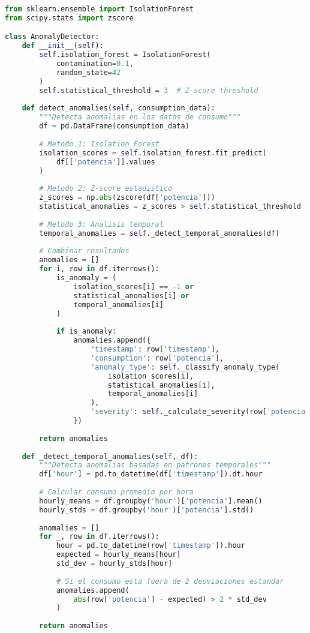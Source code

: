 \begin{lstlisting}[language=Python, caption=Sistema de detección de anomalías]
from sklearn.ensemble import IsolationForest
from scipy.stats import zscore

class AnomalyDetector:
    def __init__(self):
        self.isolation_forest = IsolationForest(
            contamination=0.1,
            random_state=42
        )
        self.statistical_threshold = 3  # Z-score threshold
        
    def detect_anomalies(self, consumption_data):
        """Detecta anomalias en los datos de consumo"""
        df = pd.DataFrame(consumption_data)
        
        # Metodo 1: Isolation Forest
        isolation_scores = self.isolation_forest.fit_predict(
            df[['potencia']].values
        )
        
        # Metodo 2: Z-score estadistico
        z_scores = np.abs(zscore(df['potencia']))
        statistical_anomalies = z_scores > self.statistical_threshold
        
        # Metodo 3: Analisis temporal
        temporal_anomalies = self._detect_temporal_anomalies(df)
        
        # Combinar resultados
        anomalies = []
        for i, row in df.iterrows():
            is_anomaly = (
                isolation_scores[i] == -1 or 
                statistical_anomalies[i] or 
                temporal_anomalies[i]
            )
            
            if is_anomaly:
                anomalies.append({
                    'timestamp': row['timestamp'],
                    'consumption': row['potencia'],
                    'anomaly_type': self._classify_anomaly_type(
                        isolation_scores[i], 
                        statistical_anomalies[i], 
                        temporal_anomalies[i]
                    ),
                    'severity': self._calculate_severity(row['potencia'], df)
                })
        
        return anomalies
    
    def _detect_temporal_anomalies(self, df):
        """Detecta anomalias basadas en patrones temporales"""
        df['hour'] = pd.to_datetime(df['timestamp']).dt.hour
        
        # Calcular consumo promedio por hora
        hourly_means = df.groupby('hour')['potencia'].mean()
        hourly_stds = df.groupby('hour')['potencia'].std()
        
        anomalies = []
        for _, row in df.iterrows():
            hour = pd.to_datetime(row['timestamp']).hour
            expected = hourly_means[hour]
            std_dev = hourly_stds[hour]
            
            # Si el consumo esta fuera de 2 desviaciones estandar
            anomalies.append(
                abs(row['potencia'] - expected) > 2 * std_dev
            )
        
        return anomalies
\end{lstlisting}

